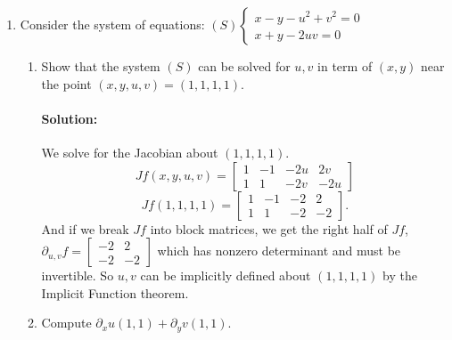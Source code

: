 \documentclass{article}
\begin{document}
\begin{enumerate}
\begin{enumerate}[label= (\alph*)]
\end{enumerate}
\newpage

\item Consider the system of equations:
$(S) \left\{\begin{array}{l}
x - y - u^2 + v^2 = 0 \\
x + y - 2uv = 0
\end{array}\right.$  
\begin{enumerate}[label= (\alph*)] 
    \item Show that the system $(S)$ can be solved for $u,v$ in term of $(x,y)$ near the point $(x,y,u,v)=(1,1,1,1).$  
        \paragraph{Solution: }We solve for the Jacobian about $(1,1,1,1)$.
         \[ Jf(x,y,u,v)=\begin{bmatrix} 
        1&-1&-2u&2v\\
        1&1&-2v&-2u \end{bmatrix} \]
        \[
        Jf(1,1,1,1)=\begin{bmatrix} 
        1&-1&-2&2\\
        1&1&-2&-2 \end{bmatrix}
        .\] 
        And if we break $Jf$ into block matrices, we get the right half of $Jf$, $\partial_{u,v}f=\begin{bmatrix} -2&2\\-2&-2 \end{bmatrix} $ which has nonzero determinant and must be invertible. So $u,v$ can be implicitly defined about $(1,1,1,1)$ by the Implicit Function theorem. 
    \item Compute $\partial_x u(1,1)+\partial_y v(1,1)$.


\end{enumerate}
\end{enumerate}
\end{document}
